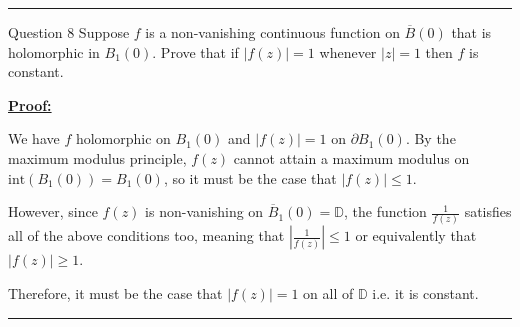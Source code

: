 \documentclass{article}
\begin{document}
\vskip 0.5cm
\hrule 
\vskip 0.5cm


\begin{mathdefinitionbox}{Question 8}
\vskip 0.5cm
Suppose $f$ is a non-vanishing continuous function on $\overline{B}(0)$ that is holomorphic in $B_1(0)$. Prove that if $|f(z)| = 1$ whenever $|z| = 1$ then $f$ is constant.
\end{mathdefinitionbox}

\vskip 0.5cm
\underline{\textbf{Proof:}}

We have $f$ holomorphic on $B_1(0)$ and $|f(z)| = 1$ on $\partial B_1(0)$. By the maximum modulus principle, $f(z)$ cannot attain a maximum modulus on $\mathrm{int}\left(B_1(0)\right) = B_1(0)$, so it must be the case that $|f(z)| \leq 1$.

\vskip 0.5cm
However, since $f(z)$ is non-vanishing on $\overline{B}_1(0) = \mathbb{D}$, the function $\frac{1}{f(z)}$ satisfies all of the above conditions too, meaning that $\left| \frac{1}{f(z)} \right| \leq 1$ or equivalently that $|f(z)| \geq 1$.

\vskip 0.5cm
Therefore, it must be the case that $|f(z)| = 1$ on all of $\mathbb{D}$ i.e. it is constant.


\vskip 0.5cm
\hrule 
\vskip 0.5cm







\end{document}
